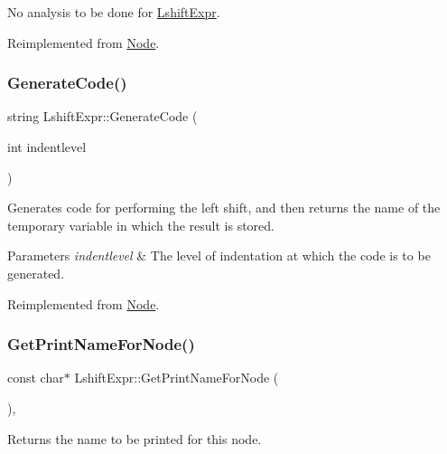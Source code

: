 No analysis to be done for \hyperlink{class_lshift_expr}{Lshift\+Expr}. 

Reimplemented from \hyperlink{class_node_a5f88d55c6f253a29def7ccc443d83d47}{Node}.

\mbox{\label{class_lshift_expr_af6e1f11ac0f62d48377eb064ca092f57}} 
\subsubsection{\texorpdfstring{Generate\+Code()}{GenerateCode()}}
{\footnotesize\ttfamily string Lshift\+Expr\+::\+Generate\+Code (\begin{DoxyParamCaption}\item[{int}]{indentlevel }\end{DoxyParamCaption})\hspace{0.3cm}{\ttfamily [virtual]}}

Generates code for performing the left shift, and then returns the name of the temporary variable in which the result is stored. 
\begin{DoxyParams}{Parameters}
{\em indentlevel} & The level of indentation at which the code is to be generated. \\
\hline
\end{DoxyParams}


Reimplemented from \hyperlink{class_node_acb60e526730e8436056375a3055c2c32}{Node}.

\mbox{\label{class_lshift_expr_ad4a55396ab3c94748ef2c165cf6abce4}} 
\subsubsection{\texorpdfstring{Get\+Print\+Name\+For\+Node()}{GetPrintNameForNode()}}
{\footnotesize\ttfamily const char$\ast$ Lshift\+Expr\+::\+Get\+Print\+Name\+For\+Node (\begin{DoxyParamCaption}{ }\end{DoxyParamCaption})\hspace{0.3cm}{\ttfamily [inline]}, {\ttfamily [virtual]}}

Returns the name to be printed for this node. 

